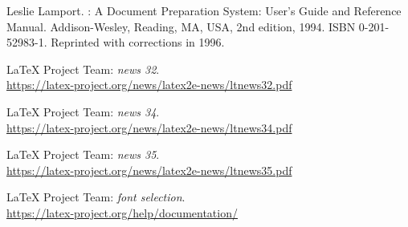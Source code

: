 \documentclass{ltnews}
\providecommand\Dash {\unskip \textemdash}
\begin{document}
\begin{thebibliography}{9}

\fontsize{9.3}{11.3}\selectfont



Leslie Lamport.
\newblock {\LaTeX}: {A} Document Preparation System: User's Guide and Reference
  Manual.
\newblock \mbox{Addison}-Wesley, Reading, MA, USA, 2nd edition, 1994.
\newblock ISBN 0-201-52983-1.
\newblock Reprinted with corrections in 1996.

 \LaTeX{} Project Team:
  \emph{\LaTeXe{} news 32}.\\
  \url{https://latex-project.org/news/latex2e-news/ltnews32.pdf}

 \LaTeX{} Project Team:
  \emph{\LaTeXe{} news 34}.\\
  \url{https://latex-project.org/news/latex2e-news/ltnews34.pdf}

 \LaTeX{} Project Team:
  \emph{\LaTeXe{} news 35}.\\
  \url{https://latex-project.org/news/latex2e-news/ltnews35.pdf}

 \LaTeX{} Project Team:
  \emph{\LaTeXe{} font selection}.\\
  \url{https://latex-project.org/help/documentation/}

\end{thebibliography}
\end{document}
